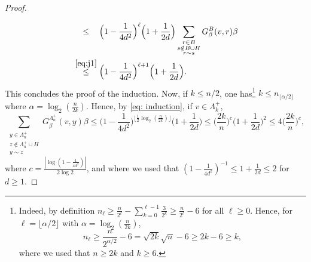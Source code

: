 \documentclass[11pt,a4paper]{article}
\numberwithin{equation}{section}
\theoremstyle{plain}
\theoremstyle{definition}
\begin{document}
\begin{proof}
\begin{align}
&\stackrel{\phantom{\eqref{eq:j1}}}\le \Big(1-\frac1{4d^2}\Big)^{\ell}\Big(1+\frac{1}{2d}\Big)\sum_{\substack{r \in B\\ s\notin B\cup H\\ r\sim s}}G_\beta^{B}(v,r)\beta\\
&\stackrel{\eqref{eq:j1}}\le \Big(1-\frac1{4d^2}\Big)^{\ell+1}\Big(1+\frac{1}{2d}\Big).
\end{align}
This concludes the proof of the induction. 
Now, if $k\leq n/2$, one has\footnote{Indeed, by definition $n_\ell\geq \tfrac{n}{2^\ell}-\sum_{k=0}^{\ell-1}\tfrac{3}{2^k}\ge \tfrac{n}{2^\ell}-6$ for all $\ell\geq 0$. Hence, for $\ell=\lfloor \alpha/2\rfloor$ with $\alpha=\log_2(\tfrac{n}{2k})$,
\begin{equation*}
	n_{\ell}\geq \frac{n}{2^{\alpha/2}}-6=\sqrt{2k}\sqrt{n}-6\geq 2k-6\geq k,
\end{equation*}
where we used that $n\geq 2k$ and $k\geq 6$.} $k\leq n_{\lfloor\alpha/2\rfloor}$ where $\alpha=\log_2(\tfrac{n}{2k})$. Hence, by \eqref{eq: induction}, if $v\in \Lambda_k^+$,
\begin{equation}
	\sum_{\substack{y \in \Lambda_n^+\\ z\notin \Lambda_n^+\cup H\\ y\sim z}}G_\beta^{\Lambda_n^+}(v,y)\beta \le\Big(1-\frac{1}{4d^2}\Big)^{\lfloor\tfrac{1}{2}\log_2(\tfrac{n}{2k})\rfloor}\Big(1+\frac{1}{2d}\Big)\leq \Big(\frac{2k}{n}\Big)^{c}\Big(1+\frac{1}{2d}\Big)^2\leq 4\Big(\frac{2k}{n}\Big)^c,
\end{equation}
where $c=\tfrac{|\log (1-\tfrac{1}{4d^2})|}{2\log 2}$, and where we used that $(1-\tfrac{1}{4d^2})^{-1}\leq 1+\tfrac{1}{2d}\leq 2$ for $d\geq 1$.
\end{proof}
\end{document}
